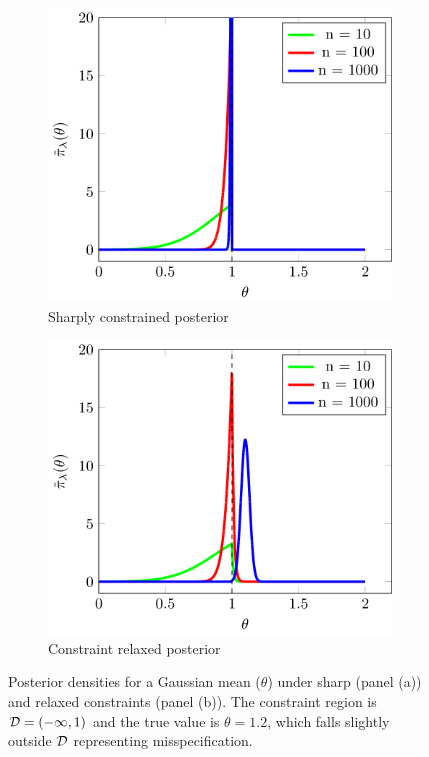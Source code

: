 \documentclass[10pt,fleqn]{article}
\DeclareMathOperator{\1}{\mathbbm{1}} \DeclareMathOperator{\bigO}{\mc O}
\begin{document}
\begin{figure}[h]
\begin{subfigure}[b]{0.45\textwidth}
 \includegraphics[width=1\textwidth]{gaussianInequalitySharp.png}
 \caption{Sharply constrained posterior}
\end{subfigure}
\begin{subfigure}[b]{0.45\textwidth}
 \includegraphics[width=1\textwidth]{gaussianInequalityRelaxed.png}
 \caption{Constraint relaxed posterior}
\end{subfigure}
 \caption{Posterior densities for a Gaussian mean ($\theta$) under sharp (panel (a)) and relaxed constraints (panel (b)). The constraint region is $\mathcal{D} = (-\infty,1)$ and the true value is $\theta=1.2$, which falls slightly outside $\mathcal{D}$ representing misspecification.
\label{fig:gaussian_inequality}}
\end{figure}
\end{document}
